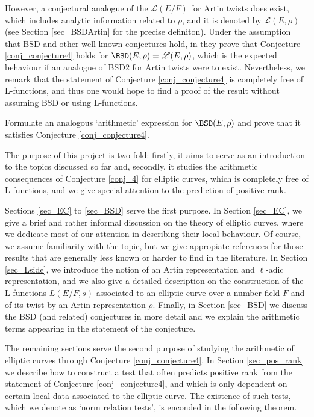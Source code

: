 However, a conjectural analogue of the $\mathcal{L}(E/F)$ for Artin twists does exist, which includes analytic information related to $\rho$, and it is denoted by $\mathcal{L}(E,\rho)$ (see Section \ref{sec_BSDArtin} for the precise definiton). Under the assumption that BSD and other well-known conjectures hold, in \cite[\S2, Theorem 5]{DEW1} they prove that Conjecture \ref{conj_conjecture4} holds for $\BSD(E,\rho)=\mathcal{L}(E,\rho)$, which is the expected behaviour if an analogue of BSD2 for Artin twists were to exist. Nevertheless, we remark that the statement of Conjecture \ref{conj_conjecture4} is completely free of L-functions, and thus one would hope to find a proof of the result without assuming BSD or using L-functions.

\begin{problem}
    Formulate an analogous `arithmetic' expression for $\BSD(E,\rho)$ and prove that it satisfies Conjecture \ref{conj_conjecture4}.
\end{problem}

The purpose of this project is two-fold: firstly, it aims to serve as an introduction to the topics discussed so far and, secondly, it studies the arithmetic consequences of Conjecture \ref{conj_4} for elliptic curves, which is completely free of L-functions, and we give special attention to the prediction of positive rank.

Sections \ref{sec_EC} to \ref{sec_BSD} serve the first purpose. In Section \ref{sec_EC}, we give a brief and rather informal discussion on the theory of elliptic curves, where we dedicate most of our attention in describing their local behaviour. Of course, we assume familiarity with the topic, but we give appropiate references for those results that are generally less known or harder to find in the literature. In Section \ref{sec_Lside}, we introduce the notion of an Artin representation and $\ell$-adic representation, and we also give a detailed description on the construction of the L-functions $L(E/F,s)$ associated to an elliptic curve over a number field $F$ and of its twist by an Artin representation $\rho$. Finally, in Section \ref{sec_BSD} we discuss the BSD (and related) conjectures in more detail and we explain the arithmetic terms appearing in the statement of the conjecture.

The remaining sections serve the second purpose of studying the arithmetic of elliptic curves through Conjecture \ref{conj_conjecture4}. In Section \ref{sec_pos_rank} we describe how to construct a test that often predicts positive rank from the statement of Conjecture \ref{conj_conjecture4}, and which is only dependent on certain local data associated to the elliptic curve. The existence of such tests, which we denote as `norm relation tests', is enconded in the following theorem.

